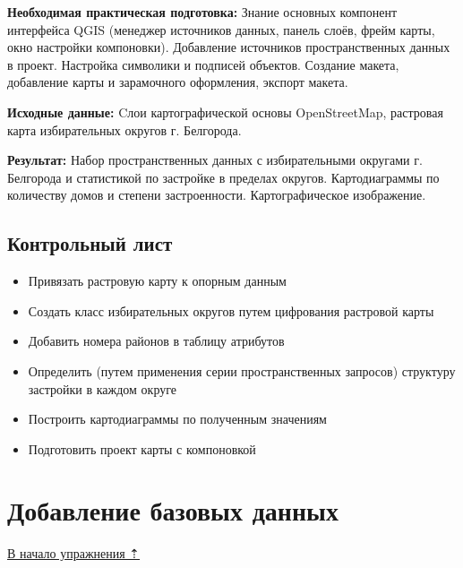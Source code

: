 \documentclass[
  12pt,
]{book}
\providecommand{\tightlist}{%
  \setlength{\itemsep}{0pt}\setlength{\parskip}{0pt}}
\begin{document}
\textbf{Необходимая практическая подготовка:} Знание основных компонент интерфейса QGIS (менеджер источников данных, панель слоёв, фрейм карты, окно настройки компоновки). Добавление источников пространственных данных в проект. Настройка символики и подписей объектов. Создание макета, добавление карты и зарамочного оформления, экспорт макета.

\textbf{Исходные данные:} Cлои картографической основы OpenStreetMap, растровая карта избирательных округов г. Белгорода.

\textbf{Результат:} Набор пространственных данных с избирательными округами г. Белгорода и статистикой по застройке в пределах округов. Картодиаграммы по количеству домов и степени застроенности. Картографическое изображение.

\hypertarget{map-ref-economic-control}{%
\subsection{Контрольный лист}\label{map-ref-economic-control}}

\begin{itemize}
\tightlist
\item
  Привязать растровую карту к опорным данным
\item
  Создать класс избирательных округов путем цифрования растровой карты
\item
  Добавить номера районов в таблицу атрибутов
\item
  Определить (путем применения серии пространственных запросов) структуру застройки в каждом округе
\item
  Построить картодиаграммы по полученным значениям
\item
  Подготовить проект карты с компоновкой
\end{itemize}

\hypertarget{map-ref-districts-basemap}{%
\section{Добавление базовых данных}\label{map-ref-districts-basemap}}

\protect\hyperlink{map-ref-districts}{В начало упражнения ⇡}
\end{document}
